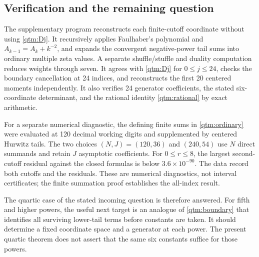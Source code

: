\subsection{Verification and the remaining question}

The supplementary program reconstructs each finite-cutoff coordinate
without using \eqref{qtm:Dj}.  It recursively applies Faulhaber's
polynomial and $A_{k-1}=A_k+k^{-2}$, and expands the convergent
negative-power tail sums into ordinary multiple zeta values.  A separate
shuffle/stuffle and duality computation reduces weights through seven.
It agrees with \eqref{qtm:Dj} for $0\le j\le24$, checks the
boundary cancellation at 24 indices, and reconstructs the first 20
centered moments independently.  It also verifies 24 generator
coefficients, the stated six-coordinate determinant, and the rational
identity \eqref{qtm:rational} by exact arithmetic.

For a separate numerical diagnostic, the defining finite sums in
\eqref{qtm:ordinary} were evaluated at 120 decimal working digits and
supplemented by centered Hurwitz tails.  The two choices
$(N,J)=(120,36)$ and $(240,54)$ use $N$ direct summands and retain
$J$ asymptotic coefficients.  For $0\le r\le8$, the largest
second-cutoff residual against the closed formulas is below
$3.6\times10^{-90}$.  The data record both cutoffs and the residuals.
These are numerical diagnostics, not interval certificates; the finite
summation proof establishes the all-index result.

The quartic case of the stated incoming question is therefore answered.
For fifth and higher powers, the useful next target is an analogue of
\eqref{qtm:boundary} that identifies all surviving lower-tail terms
before constants are taken.  It should determine a fixed coordinate
space and a generator at each power.  The present quartic theorem
does not assert that the same six constants suffice for those powers.

